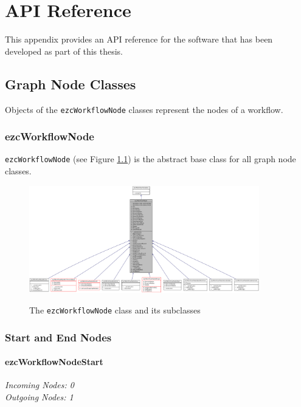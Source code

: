 \chapter{API Reference}
\label{chapter-API}

This appendix provides an API reference for the software that has been
developed as part of this thesis.

\section{Graph Node Classes}

Objects of the \texttt{ezcWorkflowNode} classes represent the nodes of a
workflow.

\subsection{ezcWorkflowNode}

\texttt{ezcWorkflowNode} (see Figure \ref{classezcWorkflowNode}) is the
abstract base class for all graph node classes.

\begin{figure}[p!]
\begin{center}
\includegraphics[angle=90,width=10cm]{figures/WorkflowNode}\\[5mm]
\end{center}
\caption{The \texttt{ezcWorkflowNode} class and its subclasses}
\label{classezcWorkflowNode}
\end{figure}

\subsection{Start and End Nodes}

\subsubsection{ezcWorkflowNodeStart}

\emph{Incoming Nodes: 0}\\
\emph{Outgoing Nodes: 1}\\

